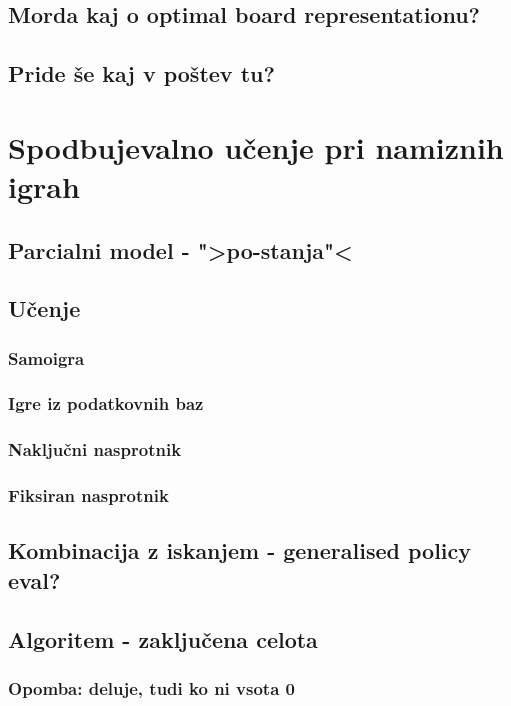 \documentclass[12pt,a4paper]{amsart}
\theoremstyle{definition} %
\theoremstyle{plain} %
\begin{document}
\subsection{Morda kaj o optimal board representationu?}
\subsection{Pride še kaj v poštev tu?}


\section{Spodbujevalno učenje pri namiznih igrah}

\subsection{Parcialni model - ">po-stanja"<}

\subsection{Učenje}
\subsubsection{Samoigra}
\subsubsection{Igre iz podatkovnih baz}
\subsubsection{Naključni nasprotnik}
\subsubsection{Fiksiran nasprotnik}

\subsection{Kombinacija z iskanjem - generalised policy eval?}

\subsection{Algoritem - zaključena celota}
\subsubsection{Opomba: deluje, tudi ko ni vsota 0}
\end{document}
